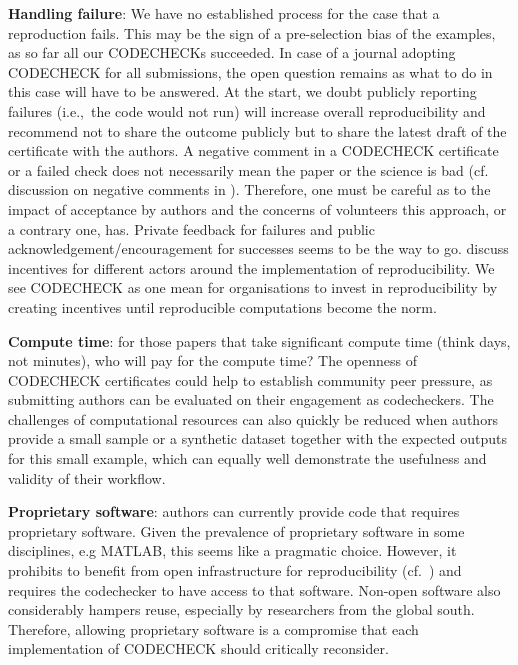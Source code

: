 \documentclass[12pt]{article}
\begin{document}
\textbf{Handling failure}: We have no established process for the case
that a reproduction fails. This may be the sign of a pre-selection bias
of the examples, as so far all our CODECHECKs succeeded.
In case of a journal adopting CODECHECK for all submissions, the open 
question remains as what to do in this case will have to be answered.
At the start, we doubt publicly reporting failures (i.e.,~the code 
would not run) will increase overall reproducibility and recommend not
to share the outcome publicly but to share the latest draft of the 
certificate with the authors.
A negative comment in a CODECHECK certificate or a failed check does
not necessarily mean the paper or the science is bad
(cf. discussion on negative comments in \cite{everythinghertz123}).
Therefore, one must be careful as to the impact of acceptance by authors 
and the concerns of volunteers this approach, or a contrary one, has.
Private feedback for failures and public acknowledgement/encouragement
for successes seems to be the way to go.
\cite{Rosenthal2016b} discuss incentives for different actors around the
implementation of reproducibility. We see CODECHECK as one mean for
organisations to invest in reproducibility by creating incentives
until reproducible computations become the norm.

\textbf{Compute time}: for those papers that take significant compute
time (think days, not minutes), who will pay for the compute time?
The openness of CODECHECK certificates could help to establish community
peer pressure, as submitting authors can be evaluated on their engagement
as codecheckers.
The challenges of computational resources can also quickly be reduced when
authors provide a small sample or a synthetic dataset together with the
expected outputs for this small example, which can equally well demonstrate the 
usefulness and validity of their workflow.

\textbf{Proprietary software}: authors can currently provide code that requires
proprietary software. Given the prevalence of proprietary software in
some disciplines, e.g MATLAB, this seems like a pragmatic choice.
However, it prohibits to benefit from open infrastructure for reproducibility
(cf.~\cite{konkol_publishing_2020,perkel_make_2019})
and requires the codechecker to have access to that software.
Non-open software also considerably hampers reuse, especially by researchers
from the global south. Therefore, allowing proprietary software is a compromise
that each implementation of CODECHECK should critically reconsider.
\end{document}
